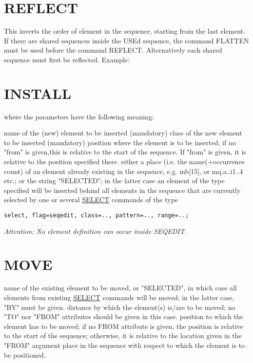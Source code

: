 \section{REFLECT}
\label{sec:reflect}
This inverts the order of element in the sequence, starting from the
last element. \\ 
If there are shared sequences inside the USEd sequence, the command
FLATTEN must be used before the command REFLECT.  Alternatively each
shared sequence must first be reflected. Example:   


\section{INSTALL}
\label{sec:install}
where the parameters have the following meaning: 
\begin{madlist}
    name of the (new) element to be inserted (mandatory) 
    class of the new element to be inserted (mandatory) 
    position where the element is to be inserted; if no "from"
     is given,this is relative to the start of the sequence. If "from"
     is given, it is relative to the position specified there. 
    either a place (i.e. the name(+occurrence count) of an
     element already existing in the sequence, e.g. mb[15], or
     mq.a..i1..4 etc.; or the string "SELECTED"; in the latter case an
     element of the type specified will be inserted behind all elements
     in the sequence that are currently selected by one or several
     \href{../Introduction/select.html}{SELECT} commands of the type 
\begin{verbatim}
select, flag=seqedit, class=.., pattern=.., range=..;
\end{verbatim} 
   \item \textit{Attention: No element definition can occur inside SEQEDIT. }
\end{madlist}

\section{MOVE}
\label{sec:move}
\begin{madlist}
    name of the existing element to be moved, or
     "SELECTED", in which case all elements from existing
     \href{../Introduction/select.html}{SELECT} commands will be moved;
     in the latter case, "BY" must be given.  
    distance by which the element(s) is/are to be moved; no "TO"
     nor "FROM" attributes should be given in this case.  
    position to which the element has to be moved; if no FROM
   attribute is given, the position is relative to the start of the sequence; otherwise, it
     is relative to the location given in the "FROM" argument  
    place in the sequence with respect to which the element
     is to be positioned.  
\end{madlist}

